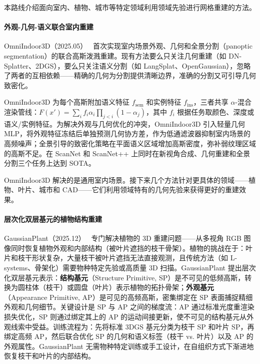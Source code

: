 本路线介绍面向室内、植物、城市等特定领域利用领域先验进行网格重建的方法。

\paragraph{外观-几何-语义联合室内重建}

OmniIndoor3D（2025.05）~\cite{2505_20610} 首次实现室内场景外观、几何和全景分割（panoptic segmentation）的联合高斯泼溅重建。现有方法要么只关注几何重建（如 DN-Splatter、2DGS），要么只关注语义分割（如 LangSplat、OpenGaussian），忽略了两者的互相依赖——精确的几何为分割提供清晰边界，准确的分割又可引导几何致密化。

OmniIndoor3D 为每个高斯附加语义特征 $f_{\text{sem}}$ 和实例特征 $f_{\text{ins}}$，三者共享 $\alpha$-混合 渲染管线：$F(x') = \sum_i f_i \alpha_i \prod_{j<i}(1-\alpha_j)$，其中 $f_i$ 根据任务取颜色、深度或语义/实例特征。为解决外观与几何优化的冲突，OmniIndoor3D 引入轻量几何 MLP，将外观特征冻结后单独预测几何协方差，作为低通滤波器抑制室内场景的高频噪声；全景引导的致密化策略在平面语义区域增加高斯密度，弥补弱纹理区域的高斯不足。在 ScanNet 和 ScanNet++ 上同时在新视角合成、几何重建和全景分割三个任务上达到 SOTA。

OmniIndoor3D 解决的是通用室内场景。接下来几个方法针对更具体的领域——植物、叶片、城市和 CAD——它们利用领域特有的几何先验来获得更好的重建效果。

\paragraph{层次化双层基元的植物结构重建}

GaussianPlant（2025.12）~\cite{2512_14087} 专门解决植物的 3D 重建问题——从多视角 RGB 图像同时恢复植物外观和内部结构（被叶片遮挡的枝干骨架）。植物的挑战在于：叶片和枝干形状复杂，大量枝干被叶片遮挡无法直接观测，且传统方法（如 L-systems、骨架化）需要物种特定先验或高质量 3D 扫描。GaussianPlant 提出层次化双层基元表示：\textbf{结构基元}（Structure Primitive, SP）是不可见的低频高斯，转换为圆柱体（枝干）或圆盘（叶片）表示植物的拓扑骨架；\textbf{外观基元}（Appearance Primitive, AP）是可见的高频高斯，密集绑定在 SP 表面捕捉精细外观和几何细节。关键设计是 SP 与 AP 之间的梯度流：AP 通过标准光度重渲染损失优化，SP 则通过绑定其上的 AP 的运动间接更新，使不可见的结构基元从外观线索中受益。训练流程为：先将标准 3DGS 基元分类为枝干 SP 和叶片 SP，再绑定高频 AP，然后联合优化 SP 的几何和语义标签（枝干 vs. 叶片）以及 AP 的外观属性。GaussianPlant 无需物种特定训练或手工设计，在自组织方式下渐进地恢复枝干和叶片的内部结构。

